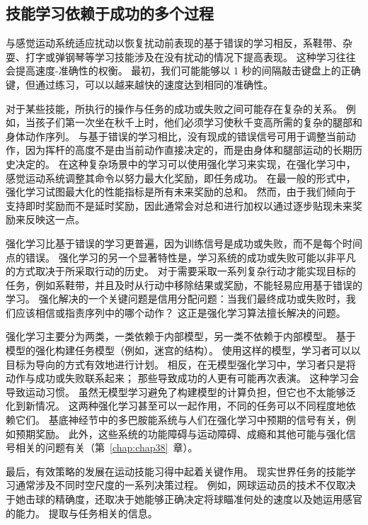 \subsection{技能学习依赖于成功的多个过程}

与感觉运动系统适应扰动以恢复扰动前表现的基于错误的学习相反，系鞋带、杂耍、打字或弹钢琴等学习技能涉及在没有扰动的情况下提高表现。
这种学习往往会提高速度-准确性的权衡。
最初，我们可能能够以 1 秒的间隔敲击键盘上的正确键，但通过练习，可以以越来越快的速度达到相同的准确性。


对于某些技能，所执行的操作与任务的成功或失败之间可能存在复杂的关系。
例如，当孩子们第一次坐在秋千上时，他们必须学习使秋千变高所需的复杂的腿部和身体动作序列。
与基于错误的学习相比，没有现成的错误信号可用于调整当前动作，因为挥杆的高度不是由当前动作直接决定的，而是由身体和腿部运动的长期历史决定的。
在这种复杂场景中的学习可以使用强化学习来实现，在强化学习中，感觉运动系统调整其命令以努力最大化奖励，即任务成功。
在最一般的形式中，强化学习试图最大化的性能指标是所有未来奖励的总和。
然而，由于我们倾向于支持即时奖励而不是延时奖励，因此通常会对总和进行加权以通过逐步贴现未来奖励来反映这一点。


强化学习比基于错误的学习更普遍，因为训练信号是成功或失败，而不是每个时间点的错误。
强化学习的另一个显著特性是，学习系统的成功或失败可能以非平凡的方式取决于所采取行动的历史。
对于需要采取一系列复杂行动才能实现目标的任务，例如系鞋带，并且及时从行动中移除结果或奖励，不能轻易应用基于错误的学习。
强化解决的一个关键问题是信用分配问题：当我们最终成功或失败时，我们应该相信或指责序列中的哪个动作？
这正是强化学习算法擅长解决的问题。


强化学习主要分为两类，一类依赖于内部模型，另一类不依赖于内部模型。
基于模型的强化构建任务模型（例如，迷宫的结构）。
使用这样的模型，学习者可以以目标为导向的方式有效地进行计划。
相反，在无模型强化学习中，学习者只是将动作与成功或失败联系起来；
那些导致成功的人更有可能再次表演。
这种学习会导致运动习惯。
虽然无模型学习避免了构建模型的计算负担，但它也不太能够泛化到新情况。
这两种强化学习甚至可以一起作用，不同的任务可以不同程度地依赖它们。
基底神经节中的多巴胺能系统与人们在强化学习中预期的信号有关，例如预期奖励。
此外，这些系统的功能障碍与运动障碍、成瘾和其他可能与强化信号相关的问题有关（第~\ref{chap:chap38}~章）。


最后，有效策略的发展在运动技能习得中起着关键作用。
现实世界任务的技能学习通常涉及不同时空尺度的一系列决策过程。
例如，网球运动员的技术不仅取决于她击球的精确度，还取决于她能够正确决定将球瞄准何处的速度以及她运用感官的能力。
提取与任务相关的信息。




